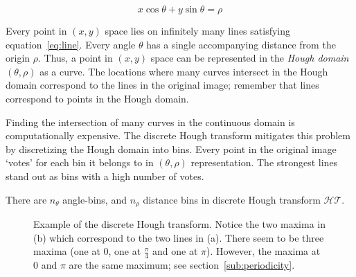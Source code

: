 \begin{equation}
\label{eq:line}
x\cos \theta + y\sin \theta = \rho
\end{equation}

Every point in $(x,y)$ space lies on infinitely many lines satisfying equation~\ref{eq:line}. Every angle $\theta$ has a single accompanying distance from the origin $\rho$. Thus, a point in $(x,y)$ space can be represented in the \emph{Hough domain} $(\theta, \rho)$ as a curve. The locations where many curves intersect in the Hough domain correspond to the lines in the original image; remember that lines correspond to points in the Hough domain. 

Finding the intersection of many curves in the continuous domain is computationally expensive. The discrete Hough transform mitigates this problem by discretizing the Hough domain into bins. Every point in the original image `votes' for each bin it belongs to in $(\theta, \rho)$ representation. The strongest lines stand out as bins with a high number of votes.

There are $n_\theta$ angle-bins, and $n_\rho$ distance bins in discrete Hough transform $\mathcal{HT}$. 

\begin{figure}[ht]
\centering
{}
\caption{Example of the discrete Hough transform. Notice the two maxima in (b) which correspond to the two lines in (a). There seem to be three maxima (one at $0$, one at $\frac{\pi}{4}$ and one at $\pi$). However, the maxima at $0$ and $\pi$ are the same maximum; see section~\ref{sub:periodicity}.}
\label{fig:lines}
\end{figure}



